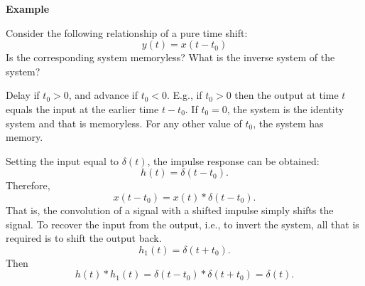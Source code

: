 \begin{frame}{}
    \noindent\textbf{Example}\par
    Consider the following relationship of a pure time shift:
    \begin{equation*}
        y(t) = x(t-t_0)
    \end{equation*}
    Is the corresponding system memoryless? What is the inverse system of the system?\par \pause
    \vspace{0.1cm}
    {
        \noindent Delay if $t_0 > 0$, and advance if $t_0 < 0$. E.g., if $t_0 > 0$ then the output at time $t$ equals the input at the earlier time $t-t_0$. If $t_0 = 0$, the system is the identity system  and that is memoryless. For any other value of $t_0$, the system has memory. \par
        \pause
        Setting the input equal to $\delta(t)$, the impulse response can be obtained:
        \begin{equation*}
            h(t) = \delta(t-t_0).
        \end{equation*}
        Therefore,
        \begin{equation*}
            x(t-t_0) = x(t)\ast \delta(t-t_0).
        \end{equation*}
        That is, the convolution of a signal with a shifted impulse simply shifts the signal. To recover the input from the output, i.e., to invert the system, all that is required is to shift the output back.
        \begin{equation*}
            h_1(t) = \delta(t+t_0).
        \end{equation*}
        Then
        \begin{equation*}
            h(t)\ast h_1(t) = \delta(t-t_0) \ast \delta(t+t_0) = \delta(t).
        \end{equation*}
    }
\end{frame}

